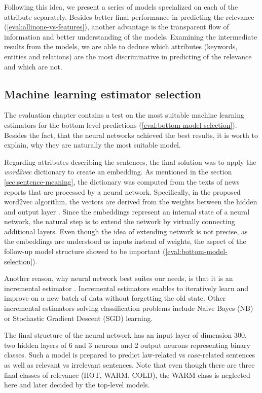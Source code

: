 \documentclass[
  digital, %
  notable,   %
  nolof,     %
  nolot,     %
]{fithesis3}
\begin{document}
Following this idea, we present a series of models specialized on each of the attribute separately.
Besides better final performance in predicting the relevance (\ref{eval:allinone-vs-features}), another advantage is the transparent flow of information and better understanding of the models.
Examining the intermediate results from the models, we are able to deduce which attributes (keywords, entities and relations) are the most discriminative in predicting of the relevance and which are not.

\subsection{Machine learning estimator selection}
\label{sec:bottom-level-nn}
The evaluation chapter contains a test on the most suitable machine learning estimators for the bottom-level predictions (\ref{eval:bottom-model-selection}).
Besides the fact, that the neural networks achieved the best results, it is worth to explain, why they are naturally the most suitable model.

Regarding attributes describing the sentences, the final solution was to apply the \textit{word2vec} dictionary to create an embedding.
As mentioned in the section \ref{sec:sentence-meaning}, the dictionary was computed from the texts of news reports that are processed by a neural network.
Specifically, in the proposed word2vec algorithm, the vectors are derived from the weights between the hidden and output layer \cite[sec. 2.2.1]{wordEmbeddings}.
Since the embeddings represent an internal state of a neural network, the natural step is to extend the network by virtually connecting additional layers.
Even though the idea of extending network is not precise, as the embeddings are understood as inputs instead of weights, the aspect of the follow-up model structure showed to be important (\ref{eval:bottom-model-selection}).

Another reason, why neural network best suites our needs, is that it is an incremental estimator \cite{incrementalScikit}.
Incremental estimators enables to iteratively learn and improve on a new batch of data without forgetting the old state.
Other incremental estimators solving classification problems include Naive Bayes (NB) or Stochastic Gradient Descent (SGD) learning.

The final structure of the neural network has an input layer of dimension 300, two hidden layers of 6 and 3 neurons and 2 output neurons representing binary classes.
Such a model is prepared to predict law-related vs case-related sentences as well as relevant vs irrelevant sentences. Note that even though there are three final classes of relevance (HOT, WARM, COLD), the WARM class is neglected here and later decided by the top-level models.
\end{document}
